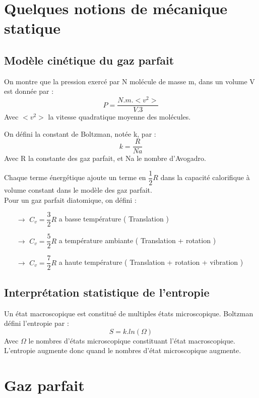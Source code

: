 \section{Quelques notions de mécanique statique}
\subsection{Modèle cinétique du gaz parfait}
\begin{de}
On montre que la pression exercé par N molécule de masse m, dans un volume V est donnée par : 
$$P = \dfrac{N.m.<v^2>}{V.3}$$
Avec $<v^2>$ la vitesse quadratique moyenne des molécules.
\end{de}
\begin{de}
On défini la constant de Boltzman, notée k, par : 
$$k = \dfrac{R}{Na}$$
Avec R la constante des gaz parfait, et Na le nombre d'Avogadro.
\end{de}
\begin{de}
Chaque terme énergétique ajoute un terme en $\dfrac{1}{2}R$ dans la capacité calorifique à volume constant dans le modèle des gaz parfait.\\
Pour un gaz parfait diatomique, on défini : 
\begin{enumerate}
 \item[$\rightarrow$] $C_v = \dfrac{3}{2}R$ a basse température ( Translation )
 \item[$\rightarrow$] $C_v = \dfrac{5}{2}R$ a température ambiante ( Translation + rotation )
 \item[$\rightarrow$] $C_v = \dfrac{7}{2}R$ a haute température ( Translation + rotation + vibration )
\end{enumerate}
\end{de}

\subsection{Interprétation statistique de l'entropie}
\begin{de}
Un état macroscopique est constitué de multiples états microscopique. Boltzman défini l'entropie par :
$$S = k.ln(\Omega)$$
Avec $\Omega$ le nombres d'états microscopique constituant l'état macroscopique.\\
L'entropie augmente donc quand le nombres d'état microscopique augmente. 
\end{de}
\section{Gaz parfait}
